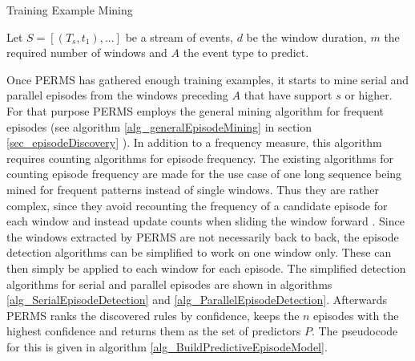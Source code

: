 \begin{algorithm}[H]
  \caption{Training Example Mining
    \label{alg_traningExampleMining}}
  \begin{algorithmic}[1]
    \Statex
    \Require Let $S=[(T_s,t_1),...]$ be a stream of events, $d$ be the window duration, $m$ the required number of windows and $A$ the event type to predict.
          	\EndIf
       	\EndIf
      \EndWhile
      \State {}
    \EndFunction
  \end{algorithmic}
\end{algorithm}

Once PERMS has gathered enough training examples, it starts to mine serial and parallel episodes from the windows preceding $A$ that have support $s$ or higher. For that purpose PERMS employs the general mining algorithm for frequent episodes (see algorithm \ref{alg_generalEpisodeMining} in section \ref{sec_episodeDiscovery} ). In addition to a frequency measure, this algorithm requires counting algorithms for episode frequency. The existing algorithms for counting episode frequency are made for the use case of one long sequence being mined for frequent patterns instead of single windows. Thus they are rather complex, since they avoid recounting the frequency of a candidate episode for each window and instead update counts when sliding the window forward \cite{mannila1997discovery}. Since the windows extracted by PERMS are not necessarily back to back, the episode detection algorithms can be simplified to work on one window only. These can then simply be applied to each window for each episode. The simplified detection algorithms for serial and parallel episodes are shown in algorithms \ref{alg_SerialEpisodeDetection} and \ref{alg_ParallelEpisodeDetection}. Afterwards PERMS ranks the discovered rules by confidence, keeps the $n$ episodes with the highest confidence and returns them as the set of predictors $P$. The pseudocode for this is given in algorithm \ref{alg_BuildPredictiveEpisodeModel}.

